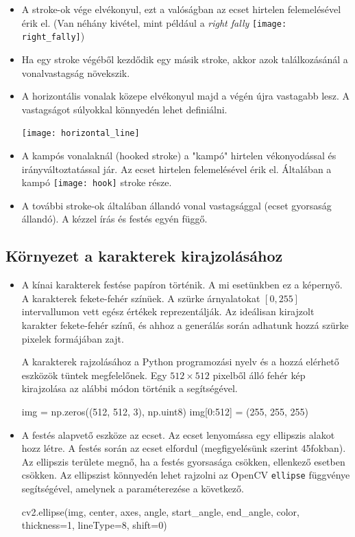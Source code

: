 \begin{itemize}
\item A stroke-ok vége elvékonyul, ezt a valóságban az ecset hirtelen felemelésével érik el. (Van néhány kivétel, mint például a \textit{right fally} \texttt{[image: right\_fally]}) 
\item Ha egy stroke végéből kezdődik egy másik stroke, akkor azok találkozásánál a vonalvastagság növekszik.
\item A horizontális vonalak közepe elvékonyul majd a végén újra vastagabb lesz. A vastagságot súlyokkal könnyedén lehet definiálni.

\begin{center}
\texttt{[image: horizontal\_line]}
\end{center}

\item A kampós vonalaknál (hooked stroke) a "kampó" hirtelen vékonyodással és irányváltoztatással jár. Az ecset hirtelen felemelésével érik el. Általában a kampó \texttt{[image: hook]} stroke része.
\item A további stroke-ok általában állandó vonal vastagsággal (ecset gyorsaság állandó). A kézzel írás és festés egyén függő.
\end{itemize}

\subsection{Környezet a karakterek kirajzolásához}

\begin{itemize}
\item A kínai karakterek festése papíron történik. A mi esetünkben ez a képernyő. A karakterek fekete-fehér színüek. A szürke árnyalatokat $[0, 255]$ intervallumon vett egész értékek reprezentálják. Az ideálisan kirajzolt karakter fekete-fehér színű, és ahhoz a generálás során adhatunk hozzá szürke pixelek formájában zajt.

A karakterek rajzolásához a Python programozási nyelv és a hozzá elérhető eszközök tüntek megfelelőnek. Egy $512 \times 512$ pixelből álló fehér kép kirajzolása az alábbi módon történik a segítségével.
\begin{python}
img = np.zeros((512, 512, 3), np.uint8)
img[0:512] = (255, 255, 255)
\end{python}

\item A festés alapvető eszköze az ecset. Az ecset lenyomássa egy ellipszis alakot hozz létre. A festés során az ecset elfordul (megfigyelésünk szerint 45fokban). Az ellipszis területe megnő, ha a festés gyorsasága csökken, ellenkező esetben csökken. Az ellipszist könnyedén lehet rajzolni az OpenCV \texttt{ellipse} függvénye segítségével, amelynek a paraméterezése a következő.
\begin{python}
cv2.ellipse(img, center, axes, angle, start_angle, 
	end_angle, color, thickness=1, lineType=8, shift=0) 
\end{python}
\end{itemize}

